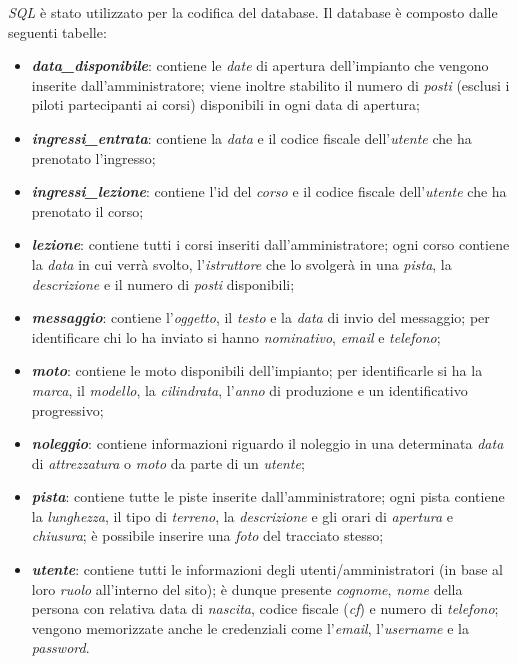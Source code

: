 \textit{SQL} è stato utilizzato per la codifica del database. Il database è composto dalle seguenti tabelle:
\begin{itemize}
    \item \textbf{\textit{data\_disponibile}}: contiene le \textit{date} di apertura dell'impianto che vengono
    inserite dall'amministratore; viene inoltre stabilito il numero di \textit{posti} (esclusi i piloti
    partecipanti ai corsi) disponibili in ogni data di apertura;
    
    \item \textbf{\textit{ingressi\_entrata}}: contiene la \textit{data} e il codice fiscale dell'\textit{utente} che ha prenotato l'ingresso;
    
    \item \textbf{\textit{ingressi\_lezione}}: contiene l'id del \textit{corso} e il codice fiscale dell'\textit{utente} che ha prenotato il corso;
    
    \item \textbf{\textit{lezione}}: contiene tutti i corsi inseriti dall'amministratore; ogni corso contiene la \textit{data}
    in cui verrà svolto, l'\textit{istruttore} che lo svolgerà in una \textit{pista}, la \textit{descrizione} e il numero di \textit{posti} disponibili;
    
    \item \textbf{\textit{messaggio}}: contiene l'\textit{oggetto}, il \textit{testo} e la \textit{data} di invio del messaggio; per identificare
    chi lo ha inviato si hanno \textit{nominativo}, \textit{email} e \textit{telefono};
    
    \item \textbf{\textit{moto}}: contiene le moto disponibili dell'impianto; per identificarle si ha la \textit{marca}, il \textit{modello},
    la \textit{cilindrata}, l'\textit{anno} di produzione e un identificativo progressivo;
    
    \item \textbf{\textit{noleggio}}: contiene informazioni riguardo il noleggio in una determinata \textit{data} di \textit{attrezzatura} o
    \textit{moto} da parte di un \textit{utente};
    
    \item \textbf{\textit{pista}}: contiene tutte le piste inserite dall'amministratore; ogni pista contiene la \textit{lunghezza}, il tipo di \textit{terreno}, la \textit{descrizione} e gli orari di \textit{apertura} e \textit{chiusura}; è possibile inserire una \textit{foto} del tracciato stesso;
    
    \item \textbf{\textit{utente}}: contiene tutti le informazioni degli utenti/amministratori (in base al loro \textit{ruolo} all'interno del sito);
    è dunque presente \textit{cognome}, \textit{nome} della persona con relativa data di \textit{nascita}, codice fiscale (\textit{cf}) e
    numero di \textit{telefono}; vengono memorizzate anche le credenziali come l'\textit{email}, l'\textit{username} e la \textit{password}.
\end{itemize}
